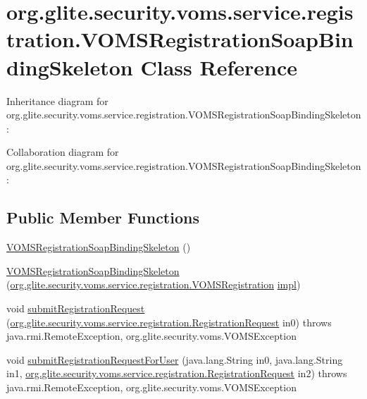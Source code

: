 \hypertarget{classorg_1_1glite_1_1security_1_1voms_1_1service_1_1registration_1_1VOMSRegistrationSoapBindingSkeleton}{
\section{org.glite.security.voms.service.registration.VOMSRegistrationSoapBindingSkeleton Class Reference}
\label{classorg_1_1glite_1_1security_1_1voms_1_1service_1_1registration_1_1VOMSRegistrationSoapBindingSkeleton}
}


Inheritance diagram for org.glite.security.voms.service.registration.VOMSRegistrationSoapBindingSkeleton:


Collaboration diagram for org.glite.security.voms.service.registration.VOMSRegistrationSoapBindingSkeleton:
\subsection*{Public Member Functions}
\begin{DoxyCompactItemize}
\item 
\hyperlink{classorg_1_1glite_1_1security_1_1voms_1_1service_1_1registration_1_1VOMSRegistrationSoapBindingSkeleton_acfbe34bf93044ea0040755c96d4c7f69}{VOMSRegistrationSoapBindingSkeleton} ()
\item 
\hyperlink{classorg_1_1glite_1_1security_1_1voms_1_1service_1_1registration_1_1VOMSRegistrationSoapBindingSkeleton_a42c29b92082f12d5c11c0ff32d16cc30}{VOMSRegistrationSoapBindingSkeleton} (\hyperlink{interfaceorg_1_1glite_1_1security_1_1voms_1_1service_1_1registration_1_1VOMSRegistration}{org.glite.security.voms.service.registration.VOMSRegistration} \hyperlink{classorg_1_1glite_1_1security_1_1voms_1_1service_1_1registration_1_1VOMSRegistrationSoapBindingSkeleton_ade0732e7f9b175d03d807702a62fa79b}{impl})
\item 
void \hyperlink{classorg_1_1glite_1_1security_1_1voms_1_1service_1_1registration_1_1VOMSRegistrationSoapBindingSkeleton_a69b8016dffaf0ad0427703cbaee5b0df}{submitRegistrationRequest} (\hyperlink{classorg_1_1glite_1_1security_1_1voms_1_1service_1_1registration_1_1RegistrationRequest}{org.glite.security.voms.service.registration.RegistrationRequest} in0)  throws java.rmi.RemoteException, org.glite.security.voms.VOMSException     
\item 
void \hyperlink{classorg_1_1glite_1_1security_1_1voms_1_1service_1_1registration_1_1VOMSRegistrationSoapBindingSkeleton_a870d00131f8ebdc3258236ec6e549a30}{submitRegistrationRequestForUser} (java.lang.String in0, java.lang.String in1, \hyperlink{classorg_1_1glite_1_1security_1_1voms_1_1service_1_1registration_1_1RegistrationRequest}{org.glite.security.voms.service.registration.RegistrationRequest} in2)  throws java.rmi.RemoteException, org.glite.security.voms.VOMSException     
\end{DoxyCompactItemize}
